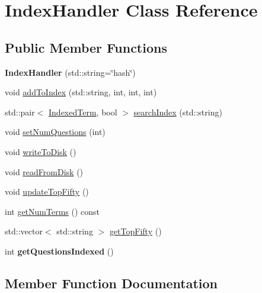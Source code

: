 \hypertarget{classIndexHandler}{}\section{Index\+Handler Class Reference}
\label{classIndexHandler}
\subsection*{Public Member Functions}
\begin{DoxyCompactItemize}
\item 
\mbox{\label{classIndexHandler_a1aebfba11f366ea373ac14bfcf6d87bb}} 
{\bfseries Index\+Handler} (std\+::string=\char`\"{}hash\char`\"{})
\item 
void \mbox{\hyperlink{classIndexHandler_a9d47f3335596c1e7e1cdffa7f47700d2}{add\+To\+Index}} (std\+::string, int, int, int)
\item 
std\+::pair$<$ \mbox{\hyperlink{classIndexedTerm}{Indexed\+Term}}, bool $>$ \mbox{\hyperlink{classIndexHandler_a1592db23c246bf89a8f7c3e588eb9594}{search\+Index}} (std\+::string)
\item 
void \mbox{\hyperlink{classIndexHandler_a54590047896406242794a9a614018d17}{set\+Num\+Questions}} (int)
\item 
void \mbox{\hyperlink{classIndexHandler_a3f0c13dfe129c5a3b02d16b2aa6f1e0f}{write\+To\+Disk}} ()
\item 
void \mbox{\hyperlink{classIndexHandler_a17ca15b3387355de1ad529c91c3f0667}{read\+From\+Disk}} ()
\item 
void \mbox{\hyperlink{classIndexHandler_ab94847987a3df0a1c52ceba59679b9ff}{update\+Top\+Fifty}} ()
\item 
int \mbox{\hyperlink{classIndexHandler_a2d1efa0d8e42f602f8fa4d51e4d25dfb}{get\+Num\+Terms}} () const
\item 
std\+::vector$<$ std\+::string $>$ \mbox{\hyperlink{classIndexHandler_a44cd905cd7699cbdc629dcd4ec934ec5}{get\+Top\+Fifty}} ()
\item 
\mbox{\label{classIndexHandler_a76059ad1aec62c6ae12f16613c899936}} 
int {\bfseries get\+Questions\+Indexed} ()
\end{DoxyCompactItemize}


\subsection{Member Function Documentation}
\mbox{\label{classIndexHandler_a9d47f3335596c1e7e1cdffa7f47700d2}} 

